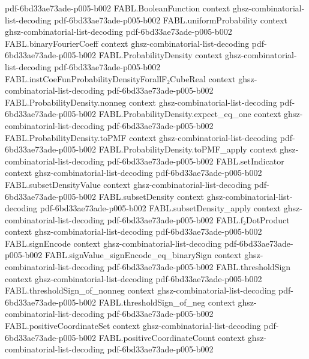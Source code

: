 \begin{theorem}
  {pdf-6bd33ae73ade-p005-b002}
\proofstep
  {FABL.BooleanFunction}
  {context}
  {ghsz-combinatorial-list-decoding}
  {pdf-6bd33ae73ade-p005-b002}
\proofstep
  {FABL.uniformProbability}
  {context}
  {ghsz-combinatorial-list-decoding}
  {pdf-6bd33ae73ade-p005-b002}
\proofstep
  {FABL.binaryFourierCoeff}
  {context}
  {ghsz-combinatorial-list-decoding}
  {pdf-6bd33ae73ade-p005-b002}
\proofstep
  {FABL.ProbabilityDensity}
  {context}
  {ghsz-combinatorial-list-decoding}
  {pdf-6bd33ae73ade-p005-b002}
\proofstep
  {FABL.instCoeFunProbabilityDensityForallF₂CubeReal}
  {context}
  {ghsz-combinatorial-list-decoding}
  {pdf-6bd33ae73ade-p005-b002}
\proofstep
  {FABL.ProbabilityDensity.nonneg}
  {context}
  {ghsz-combinatorial-list-decoding}
  {pdf-6bd33ae73ade-p005-b002}
\proofstep
  {FABL.ProbabilityDensity.expect_eq_one}
  {context}
  {ghsz-combinatorial-list-decoding}
  {pdf-6bd33ae73ade-p005-b002}
\proofstep
  {FABL.ProbabilityDensity.toPMF}
  {context}
  {ghsz-combinatorial-list-decoding}
  {pdf-6bd33ae73ade-p005-b002}
\proofstep
  {FABL.ProbabilityDensity.toPMF_apply}
  {context}
  {ghsz-combinatorial-list-decoding}
  {pdf-6bd33ae73ade-p005-b002}
\proofstep
  {FABL.setIndicator}
  {context}
  {ghsz-combinatorial-list-decoding}
  {pdf-6bd33ae73ade-p005-b002}
\proofstep
  {FABL.subsetDensityValue}
  {context}
  {ghsz-combinatorial-list-decoding}
  {pdf-6bd33ae73ade-p005-b002}
\proofstep
  {FABL.subsetDensity}
  {context}
  {ghsz-combinatorial-list-decoding}
  {pdf-6bd33ae73ade-p005-b002}
\proofstep
  {FABL.subsetDensity_apply}
  {context}
  {ghsz-combinatorial-list-decoding}
  {pdf-6bd33ae73ade-p005-b002}
\proofstep
  {FABL.f₂DotProduct}
  {context}
  {ghsz-combinatorial-list-decoding}
  {pdf-6bd33ae73ade-p005-b002}
\proofstep
  {FABL.signEncode}
  {context}
  {ghsz-combinatorial-list-decoding}
  {pdf-6bd33ae73ade-p005-b002}
\proofstep
  {FABL.signValue_signEncode_eq_binarySign}
  {context}
  {ghsz-combinatorial-list-decoding}
  {pdf-6bd33ae73ade-p005-b002}
\proofstep
  {FABL.thresholdSign}
  {context}
  {ghsz-combinatorial-list-decoding}
  {pdf-6bd33ae73ade-p005-b002}
\proofstep
  {FABL.thresholdSign_of_nonneg}
  {context}
  {ghsz-combinatorial-list-decoding}
  {pdf-6bd33ae73ade-p005-b002}
\proofstep
  {FABL.thresholdSign_of_neg}
  {context}
  {ghsz-combinatorial-list-decoding}
  {pdf-6bd33ae73ade-p005-b002}
\proofstep
  {FABL.positiveCoordinateSet}
  {context}
  {ghsz-combinatorial-list-decoding}
  {pdf-6bd33ae73ade-p005-b002}
\proofstep
  {FABL.positiveCoordinateCount}
  {context}
  {ghsz-combinatorial-list-decoding}
  {pdf-6bd33ae73ade-p005-b002}
\proofstep

\end{theorem}
